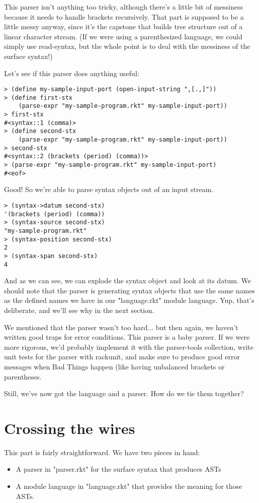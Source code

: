 \documentclass{article}
\begin{document}
This parser isn't anything too tricky, although there's a little bit of messiness because it needs to handle brackets recursively. That part is supposed to be a little messy anyway, since it's the capstone that builds tree structure out of a linear character stream. (If we were using a parenthesized language, we could simply use read-syntax, but the whole point is to deal with the messiness of the surface syntax!)


Let's see if this parser does anything useful:
\begin{verbatim}
> (define my-sample-input-port (open-input-string ",[.,]"))
> (define first-stx
    (parse-expr "my-sample-program.rkt" my-sample-input-port))
> first-stx
#<syntax::1 (comma)>
> (define second-stx
    (parse-expr "my-sample-program.rkt" my-sample-input-port))
> second-stx
#<syntax::2 (brackets (period) (comma))>
> (parse-expr "my-sample-program.rkt" my-sample-input-port)
#<eof>
\end{verbatim}
Good! So we're able to parse syntax objects out of an input stream.
\begin{verbatim}
> (syntax->datum second-stx)
'(brackets (period) (comma))
> (syntax-source second-stx)
"my-sample-program.rkt"
> (syntax-position second-stx)
2
> (syntax-span second-stx)
4
\end{verbatim}
And as we can see, we can explode the syntax object and look at its datum. We should note that the parser is generating syntax objects that use the same names as the defined names we have in our "language.rkt" module language. Yup, that's deliberate, and we'll see why in the next section.


We mentioned that the parser wasn't too hard... but then again, we haven't written good traps for error conditions. This parser is a baby parser. If we were more rigorous, we'd probably implement it with the parser-tools collection, write unit tests for the parser with rackunit, and make sure to produce good error messages when Bad Things happen (like having unbalanced brackets or parentheses.

Still, we've now got the language and a parser. How do we tie them together?

\section{Crossing the wires}
This part is fairly straightforward. We have two pieces in hand:

\begin{itemize}
\item A parser in "parser.rkt" for the surface syntax that produces ASTs

\item A module language in "language.rkt" that provides the meaning for those ASTs.
\end{itemize}
\end{document}
